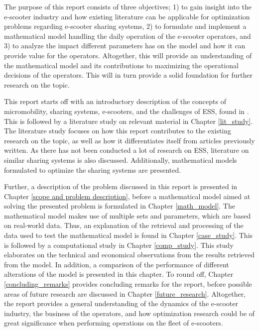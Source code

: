 The purpose of this report consists of three objectives; 1) to gain insight into the e-scooter industry and how existing literature can be applicable for optimization problems regarding e-scooter sharing systems, 2) to formulate and implement a mathematical model handling the daily operation of the e-scooter operators, and 3) to analyze the impact different parameters has on the model and how it can provide value for the operators. Altogether, this will provide an understanding of the mathematical model and its contributions to maximizing the operational decisions of the operators. This will in turn provide a solid foundation for further research on the topic.

This report starts off with an introductory description of the concepts of micromobility, sharing systems, e-scooters, and the challenges of ESS, found in . This is followed by a literature study on relevant material in Chapter \ref{lit_study}. The literature study focuses on how this report contributes to the existing research on the topic, as well as how it differentiates itself from articles previously written. As there has not been conducted a lot of research on ESS, literature on similar sharing systems is also discussed. Additionally, mathematical models formulated to optimize the sharing systems are presented.

Further, a description of the problem discussed in this report is presented in Chapter \ref{scope and problem description}, before a mathematical model aimed at solving the presented problem is formulated in Chapter \ref{math_model}. The mathematical model makes use of multiple sets and parameters, which are based on real-world data. Thus, an explanation of the retrieval and processing of the data used to test the mathematical model is found in Chapter \ref{case_study}. This is followed by a computational study in Chapter \ref{comp_study}. This study elaborates on the technical and economical observations from the results retrieved from the model. In addition, a comparison of the performance of different alterations of the model is presented in this chapter. To round off, Chapter \ref{concluding_remarks} provides concluding remarks for the report, before possible areas of future research are discussed in Chapter \ref{future_research}. Altogether, the report provides a general understanding of the dynamics of the e-scooter industry, the business of the operators, and how optimization research could be of great significance when performing operations on the fleet of e-scooters. 

